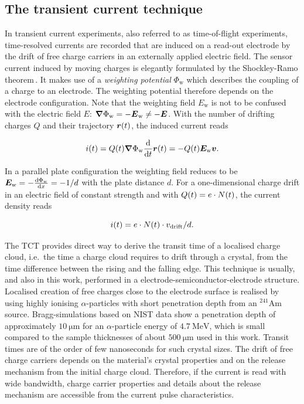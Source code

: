 
\subsection{The transient current technique}

In transient current experiments, also referred to as time-of-flight experiments,
 time-resolved currents are recorded that are induced on a read-out electrode by the drift of free charge carriers in an externally applied electric field. 
The sensor current induced by moving charges is elegantly formulated by the Shockley-Ramo theorem\,\cite{1686997}.
It makes use of a \textit{weighting potential} $\Phi_{\textrm{w}}$ which describes the coupling of a charge to an electrode.
The weighting potential therefore depends on the electrode configuration. 
Note that the weighting field $E_\textrm{w}$ is not to be confused with the electric field $E$: $\boldsymbol{\nabla}\Phi_{\textrm{w}} = - \boldsymbol{E}_{\textrm{w}} \neq - \boldsymbol{E}$.
With the number of drifting charges $Q$ and their trajectory $\boldsymbol{r}(t)$, the induced current reads

\begin{equation}
 i(t) = Q(t) \boldsymbol{\nabla}\Phi_{\textrm{w}} \frac{\mathrm d}{\mathrm d t}\boldsymbol{r}(t) = - Q(t) \boldsymbol{E_{\textrm{w}}} \boldsymbol{v}. 
\end{equation}

\noindent
In a parallel plate configuration the weighting field reduces to be $\boldsymbol{E_{\textrm{w}}} =  -\frac{\mathrm d \Phi_{\textrm{w}}}{\mathrm d x}= -1/d$ with the plate distance $d$. 
For a one-dimensional charge drift in an electric field of constant strength and with $Q(t) = \mathnormal{e} \cdot N(t)$, the current density reads

\begin{equation}
  i(t) = \mathnormal{e} \cdot N(t) \cdot v_{\textrm{drift}} / d.
 \label{eq:ramo}
\end{equation}

The TCT provides direct way to derive the transit time of a localised charge cloud, i.e.~the time a charge cloud requires to drift through a crystal,
 from the time difference between the rising and the falling edge. 
This technique is usually, and also in this work, performed in a electrode-semiconductor-electrode structure.
Localised creation of free charges close to the electrode surface is realised by using highly ionising $\alpha$-particles with short penetration depth
 from an ${}^{241}\textrm{Am}$ source. 
Bragg-simulations based on NIST data \cite{NIST} show a penetration depth of approximately $\SI{10}{\micro\meter}$ for an $\alpha$-particle energy of $\SI{4.7}{\MeV}$,
 which is small compared to the sample thicknesses of about $\SI{500}{\micro\meter}$ used in this work. 
Transit times are of the order of few nanoseconds for such crystal sizes.
The drift of free charge carriers depends on the material's crystal properties and on the release mechanism from the initial charge cloud. 
Therefore, if the current is read with wide bandwidth, charge carrier properties and details about the release mechanism are accessible from the current pulse characteristics. 


